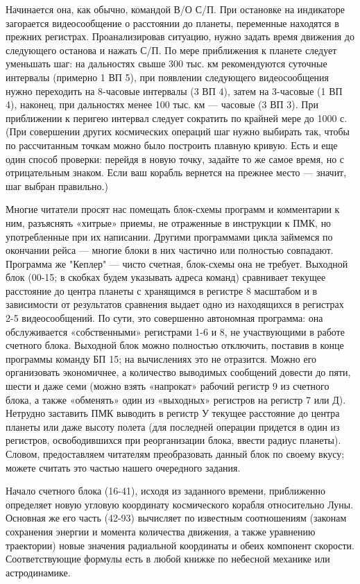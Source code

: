 \documentclass[11pt,a4paper,oneside]{article}
\begin{document}
Начинается она, как обычно, командой В/О С/П. При остановке на индикаторе загорается видеосообщение о расстоянии до планеты, переменные находятся в прежних регистрах. Проанализировав ситуацию, нужно задать время движения до следующего останова и нажать С/П. По мере приближения к планете следует уменьшать шаг: на дальностях свыше 300 тыс. км рекомендуются суточные интервалы (примерно 1 ВП 5), при появлении следующего видеосообщения нужно переходить на 8-часовые интервалы (3 ВП 4), затем на 3-часовые (1 ВП 4), наконец, при дальностях менее 100 тыс. км — часовые (3 ВП 3). При приближении к перигею интервал следует сократить по крайней мере до 1000 с. (При совершении других космических операций шаг нужно выбирать так, чтобы по рассчитанным точкам можно было построить плавную кривую. Есть и еще один способ проверки: перейдя в новую точку, задайте то же самое время, но с отрицательным знаком. Если ваш корабль вернется на прежнее место — значит, шаг выбран правильно.)

Многие читатели просят нас помещать блок-схемы программ и комментарии к ним, разъяснять «хитрые» приемы, не отраженные в инструкции к ПМК, но употребленные при их написании. Другими программами цикла займемся по окончании рейса — многие блоки в них частично или полностью совпадают. Программа же "Кеплер" — чисто счетная, блок-схемы она не требует. Выходной блок (00-15; в скобках будем указывать адреса команд) сравнивает текущее расстояние до центра планеты с хранящимся в регистре 8 масштабом и в зависимости от результатов сравнения выдает одно из находящихся в регистрах 2-5 видеосообщений. По сути, это совершенно автономная программа: она обслуживается «собственными» регистрами 1-6 и 8, не участвующими в работе счетного блока. Выходной блок можно полностью отключить, поставив в конце программы команду БП 15; на вычислениях это не отразится. Можно его организовать экономичнее, а количество выводимых сообщений довести до пяти, шести и даже семи (можно взять «напрокат» рабочий регистр 9 из счетного блока, а также «обменять» один из «выходных» регистров на регистр 7 или Д). Нетрудно заставить ПМК выводить в регистр У текущее расстояние до центра планеты или даже высоту полета (для последней операции придется в один из регистров, освободившихся при реорганизации блока, ввести радиус планеты). Словом, предоставляем читателям преобразовать данный блок по своему вкусу; можете считать это частью нашего очередного задания.

Начало счетного блока (16-41), исходя из заданного времени, приближенно определяет новую угловую координату космического корабля относительно Луны. Основная же его часть (42-93) вычисляет по известным соотношениям (законам сохранения энергии и момента количества движения, а также уравнению траектории) новые значения радиальной координаты и обеих компонент скорости. Соответствующие формулы есть в любой книжке по небесной механике или астродинамике.
\end{document}
